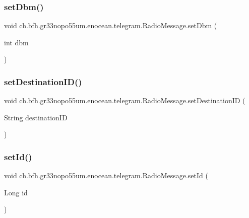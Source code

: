 \subsubsection{\texorpdfstring{set\+Dbm()}{setDbm()}}
{\footnotesize\ttfamily void ch.\+bfh.\+gr33nopo55um.\+enocean.\+telegram.\+Radio\+Message.\+set\+Dbm (\begin{DoxyParamCaption}\item[{int}]{dbm }\end{DoxyParamCaption})}

\hypertarget{classch_1_1bfh_1_1gr33nopo55um_1_1enocean_1_1telegram_1_1_radio_message_a5ef09eb0c1963fe42cfd3605aca570ba}{}\label{classch_1_1bfh_1_1gr33nopo55um_1_1enocean_1_1telegram_1_1_radio_message_a5ef09eb0c1963fe42cfd3605aca570ba} 
\subsubsection{\texorpdfstring{set\+Destination\+I\+D()}{setDestinationID()}}
{\footnotesize\ttfamily void ch.\+bfh.\+gr33nopo55um.\+enocean.\+telegram.\+Radio\+Message.\+set\+Destination\+ID (\begin{DoxyParamCaption}\item[{String}]{destination\+ID }\end{DoxyParamCaption})}

\hypertarget{classch_1_1bfh_1_1gr33nopo55um_1_1enocean_1_1telegram_1_1_radio_message_a52fe9b52ec3414770a89f1f82c3bdf81}{}\label{classch_1_1bfh_1_1gr33nopo55um_1_1enocean_1_1telegram_1_1_radio_message_a52fe9b52ec3414770a89f1f82c3bdf81} 
\subsubsection{\texorpdfstring{set\+Id()}{setId()}}
{\footnotesize\ttfamily void ch.\+bfh.\+gr33nopo55um.\+enocean.\+telegram.\+Radio\+Message.\+set\+Id (\begin{DoxyParamCaption}\item[{Long}]{id }\end{DoxyParamCaption})}

